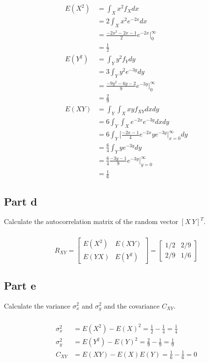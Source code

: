 \documentclass[11pt]{article}
\begin{document}
\subparagraph*{}
\begin{align*}
	E(X^2) &= \int_X x^2f_Xdx \\
	&= 2\int_X x^2e^{-2x}dx \\
	&= \frac{-2x^2-2x-1}{2}e^{-2x}\Big|_0^\infty \\
	&= \frac{1}{2} \\
	E(Y^2) &= \int_Y y^2f_Ydy \\
	&= 3 \int_Y y^2e^{-3y}dy \\
	&= \frac{-9y^2-6y-2}{9}e^{-3y}\Big|_0^\infty \\
	&= \frac{2}{9} \\
	E(XY) &= \int_Y\int_X xyf_{XY}dxdy \\
	&= 6\int_Y\int_X e^{-2x}e^{-3y}dxdy \\
	&= 6\int_Y\Big[\frac{-2x-1}{4}e^{-2x}ye^{-3y}\Big|_{x=0}^\infty dy \\
	&= \frac{6}{4}\int_Y ye^{-3y}dy \\
	&= \frac{6}{4}\frac{-3y-1}{9}e^{-3y}\Big|_{y=0}^\infty \\
	&= \frac{1}{6}
\end{align*}

\subsection*{Part d}
Calculate the autocorrelation matrix of the random vector $[X\ Y]^T$.

\subparagraph*{}
\begin{equation*}
	R_{XY} = \begin{bmatrix} E(X^2) & E(XY) \\ E(YX) & E(Y^2) \end{bmatrix}
	= \begin{bmatrix} 1/2 & 2/9 \\ 2/9 & 1/6 \end{bmatrix}
\end{equation*}

\subsection*{Part e}
Calculate the variance $\sigma_x^2$ and $\sigma_y^2$ and the covariance $C_{XY}$.

\subparagraph*{}
\begin{align*}
	\sigma_x^2 &= E(X^2)-E(X)^2 = \frac{1}{2}-\frac{1}{4} = \frac{1}{4} \\
	\sigma_y^2 &= E(Y^2)-E(Y)^2 = \frac{2}{9}-\frac{1}{9} = \frac{1}{9} \\
	C_{XY} &= E(XY) - E(X)E(Y) = \frac{1}{6}-\frac{1}{6} = 0
\end{align*}
\end{document}
